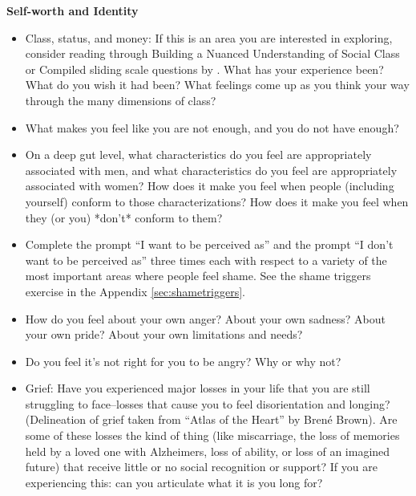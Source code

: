 \documentclass[12pt,letterpaper]{article}
\begin{document}
\noindent \textbf{Self-worth and Identity}
\begin{itemize}
    \item Class, status, and money: If this is an area you are interested in exploring, consider reading through Building a Nuanced Understanding of Social Class or Compiled sliding scale questions by \textcite{harperClass} . What has your experience been? What do you wish it had been? What feelings come up as you think your way through the many dimensions of class?
    \item  What makes you feel like you are not enough, and you do not have enough?
    \item  On a deep gut level, what characteristics do you feel are appropriately associated with men, and what characteristics do you feel are appropriately associated with women? How does it make you feel when people (including yourself) conform to those characterizations? How does it make you feel when they (or you) *don't* conform to them?
    \item  Complete the prompt “I want to be perceived as” and the prompt “I don't want to be perceived as” three times each with respect to a variety of the most important areas where people feel shame. See the shame triggers exercise in the Appendix \ref{sec:shametriggers}.
    \item  How do you feel about your own anger? About your own sadness? About your own pride? About your own limitations and needs?
    \item  Do you feel it's not right for you to be angry? Why or why not?
    \item  Grief: Have you experienced major losses in your life that you are still struggling to face--losses that cause you to feel disorientation and longing? (Delineation of grief taken from “Atlas of the Heart” by Brené Brown). Are some of these losses the kind of thing (like miscarriage, the loss of memories held by a loved one with Alzheimers, loss of ability, or loss of an imagined future) that receive little or no social recognition or support? If you are experiencing this: can you articulate what it is you long for?
\end{itemize}
\end{document}
